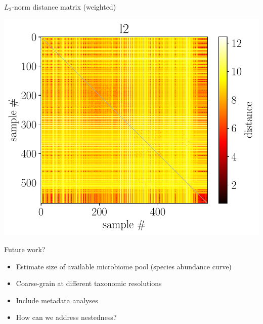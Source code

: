 \documentclass[
  ignorenonframetext,
]{beamer}
\providecommand{\tightlist}{%
  \setlength{\itemsep}{0pt}\setlength{\parskip}{0pt}}
\begin{document}
\begin{frame}{\(L_2\)-norm distance matrix (weighted)}
\protect\hypertarget{l_2-norm-distance-matrix-weighted}{}

\centering

\includegraphics[width=.9\linewidth]{figs/l2_distance_matrix}

\end{frame}

\begin{frame}{Future work?}
\protect\hypertarget{future-work}{}

\Large

\begin{itemize}
\tightlist
\item
  Estimate size of available microbiome pool (species abundance curve)
\item
  Coarse-grain at different taxonomic resolutions
\item
  Include metadata analyses
\item
  How can we address nestedness?
\end{itemize}

\end{frame}
\end{document}

